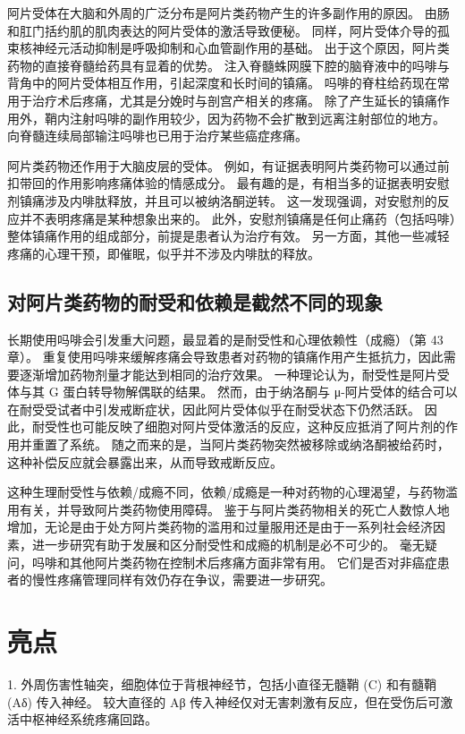 阿片受体在大脑和外周的广泛分布是阿片类药物产生的许多副作用的原因。 由肠和肛门括约肌的肌肉表达的阿片受体的激活导致便秘。 同样，阿片受体介导的孤束核神经元活动抑制是呼吸抑制和心血管副作用的基础。 出于这个原因，阿片类药物的直接脊髓给药具有显着的优势。 注入脊髓蛛网膜下腔的脑脊液中的吗啡与背角中的阿片受体相互作用，引起深度和长时间的镇痛。 吗啡的脊柱给药现在常用于治疗术后疼痛，尤其是分娩时与剖宫产相关的疼痛。 除了产生延长的镇痛作用外，鞘内注射吗啡的副作用较少，因为药物不会扩散到远离注射部位的地方。 向脊髓连续局部输注吗啡也已用于治疗某些癌症疼痛。

阿片类药物还作用于大脑皮层的受体。 例如，有证据表明阿片类药物可以通过前扣带回的作用影响疼痛体验的情感成分。 最有趣的是，有相当多的证据表明安慰剂镇痛涉及内啡肽释放，并且可以被纳洛酮逆转。 这一发现强调，对安慰剂的反应并不表明疼痛是某种想象出来的。 此外，安慰剂镇痛是任何止痛药（包括吗啡）整体镇痛作用的组成部分，前提是患者认为治疗有效。 另一方面，其他一些减轻疼痛的心理干预，即催眠，似乎并不涉及内啡肽的释放。

\subsection{对阿片类药物的耐受和依赖是截然不同的现象}
长期使用吗啡会引发重大问题，最显着的是耐受性和心理依赖性（成瘾）（第 43 章）。 重复使用吗啡来缓解疼痛会导致患者对药物的镇痛作用产生抵抗力，因此需要逐渐增加药物剂量才能达到相同的治疗效果。 一种理论认为，耐受性是阿片受体与其 G 蛋白转导物解偶联的结果。 然而，由于纳洛酮与 μ-阿片受体的结合可以在耐受受试者中引发戒断症状，因此阿片受体似乎在耐受状态下仍然活跃。 因此，耐受性也可能反映了细胞对阿片受体激活的反应，这种反应抵消了阿片剂的作用并重置了系统。 随之而来的是，当阿片类药物突然被移除或纳洛酮被给药时，这种补偿反应就会暴露出来，从而导致戒断反应。

这种生理耐受性与依赖/成瘾不同，依赖/成瘾是一种对药物的心理渴望，与药物滥用有关，并导致阿片类药物使用障碍。 鉴于与阿片类药物相关的死亡人数惊人地增加，无论是由于处方阿片类药物的滥用和过量服用还是由于一系列社会经济因素，进一步研究有助于发展和区分耐受性和成瘾的机制是必不可少的。 毫无疑问，吗啡和其他阿片类药物在控制术后疼痛方面非常有用。 它们是否对非癌症患者的慢性疼痛管理同样有效仍存在争议，需要进一步研究。


\section{亮点}

1. 外周伤害性轴突，细胞体位于背根神经节，包括小直径无髓鞘 (C) 和有髓鞘 (Aδ) 传入神经。 较大直径的 Aβ 传入神经仅对无害刺激有反应，但在受伤后可激活中枢神经系统疼痛回路。 


